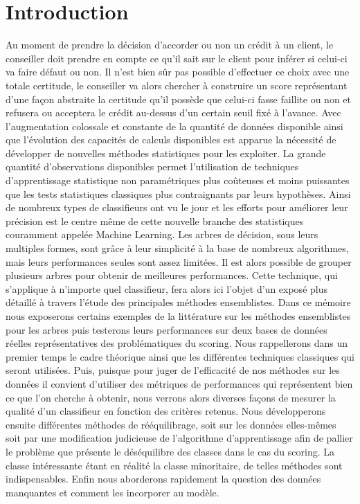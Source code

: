 
\cleardoublepage
{}
\chapter*{Introduction}\label{chap:intro}

Au moment de prendre la décision d'accorder ou non un crédit à un client, le conseiller doit prendre en compte ce qu’il sait sur le client pour inférer si celui-ci va faire défaut ou non. Il n’est bien sûr pas possible d’effectuer ce choix avec une totale certitude, le conseiller va alors chercher à construire un score représentant d’une façon abstraite la certitude qu’il possède que celui-ci fasse faillite ou non et refusera ou acceptera le crédit au-dessus d’un certain seuil fixé à l’avance.
Avec l’augmentation colossale et constante de la quantité de données disponible ainsi que l’évolution des capacités de calculs disponibles est apparue la nécessité de développer de nouvelles méthodes statistiques pour les exploiter. La grande quantité d’observations disponibles permet l’utilisation de techniques d’apprentissage statistique non paramétriques plus coûteuses et moins puissantes que les tests statistiques classiques plus contraignants par leurs hypothèses. Ainsi de nombreux types de classifieurs ont vu le jour et les efforts pour améliorer leur précision est le centre même de cette nouvelle branche des statistiques couramment appelée Machine Learning. Les arbres de décision, sous leurs multiples formes, sont grâce à leur simplicité à la base de nombreux algorithmes, mais leurs performances seules sont assez limitées. Il est alors possible de grouper plusieurs arbres pour obtenir de meilleures performances. Cette technique, qui s’applique à n’importe quel classifieur, fera alors ici l’objet d’un exposé plus détaillé à travers l’étude des principales méthodes ensemblistes.
Dans ce mémoire nous exposerons certains exemples de la littérature sur les méthodes ensemblistes pour les arbres puis testerons leurs performances sur deux bases de données réelles représentatives des problématiques du scoring. Nous rappellerons dans un premier temps le cadre théorique ainsi que les différentes techniques classiques qui seront utilisées. Puis, puisque pour juger de l’efficacité de nos méthodes sur les données il convient d’utiliser des métriques de performances qui représentent bien ce que l’on cherche à obtenir, nous verrons alors diverses façons de mesurer la qualité d’un classifieur en fonction des critères retenus.
Nous développerons ensuite différentes méthodes de rééquilibrage, soit sur les données elles-mêmes soit par une modification judicieuse de l’algorithme d’apprentissage afin de pallier le problème que présente le déséquilibre des classes dans le cas du scoring. La classe intéressante étant en réalité la classe minoritaire, de telles méthodes sont indispensables.
Enfin nous aborderons rapidement la question des données manquantes et comment les incorporer au modèle.

